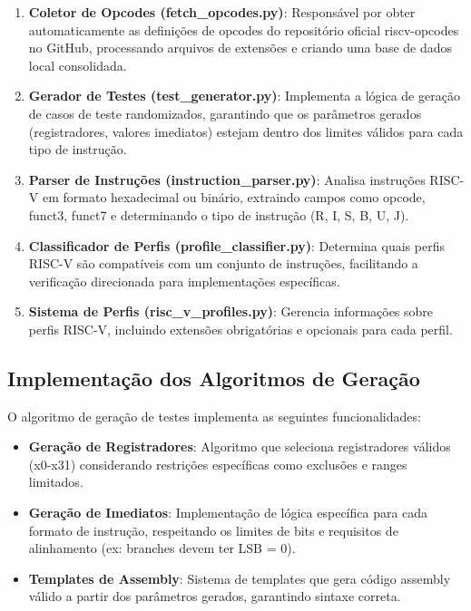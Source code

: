 \documentclass[12pt,a4paper]{article}
\begin{document}
\begin{enumerate}
    \item \textbf{Coletor de Opcodes (fetch\_opcodes.py)}: Responsável por obter automaticamente as definições de opcodes do repositório oficial riscv-opcodes no GitHub, processando arquivos de extensões e criando uma base de dados local consolidada.
    
    \item \textbf{Gerador de Testes (test\_generator.py)}: Implementa a lógica de geração de casos de teste randomizados, garantindo que os parâmetros gerados (registradores, valores imediatos) estejam dentro dos limites válidos para cada tipo de instrução.
    
    \item \textbf{Parser de Instruções (instruction\_parser.py)}: Analisa instruções RISC-V em formato hexadecimal ou binário, extraindo campos como opcode, funct3, funct7 e determinando o tipo de instrução (R, I, S, B, U, J).
    
    \item \textbf{Classificador de Perfis (profile\_classifier.py)}: Determina quais perfis RISC-V são compatíveis com um conjunto de instruções, facilitando a verificação direcionada para implementações específicas.
    
    \item \textbf{Sistema de Perfis (risc\_v\_profiles.py)}: Gerencia informações sobre perfis RISC-V, incluindo extensões obrigatórias e opcionais para cada perfil.
\end{enumerate}

\subsection{Implementação dos Algoritmos de Geração}

O algoritmo de geração de testes implementa as seguintes funcionalidades:

\begin{itemize}
    \item \textbf{Geração de Registradores}: Algoritmo que seleciona registradores válidos (x0-x31) considerando restrições específicas como exclusões e ranges limitados.
    
    \item \textbf{Geração de Imediatos}: Implementação de lógica específica para cada formato de instrução, respeitando os limites de bits e requisitos de alinhamento (ex: branches devem ter LSB = 0).
    
    \item \textbf{Templates de Assembly}: Sistema de templates que gera código assembly válido a partir dos parâmetros gerados, garantindo sintaxe correta.
\end{itemize}
\end{document}
